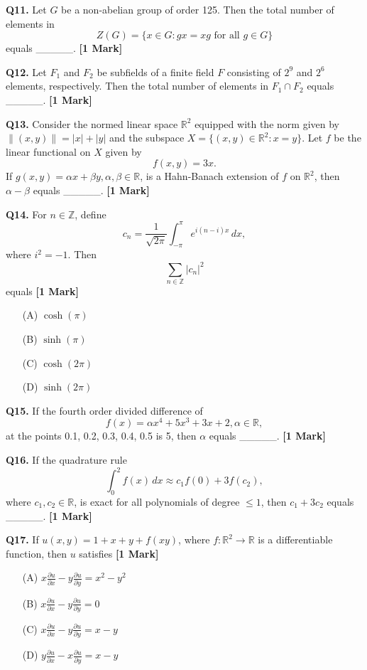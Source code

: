 \documentclass[11pt]{article}
\newcommand{\questiona}[2]{
    \noindent\textbf{Q#2.} #1 \hfill \textbf{[1 Mark]}
}
\begin{document}
\questiona{Let \( G \) be a non-abelian group of order 125. Then the total number of elements in \[Z(G) = \{ x \in G : g x = x g \text{ for all } g \in G \}\] equals \_\_\_\_\_.}{11}
\vspace{0.5cm}

\questiona{Let \( F_1 \) and \( F_2 \) be subfields of a finite field \( F \) consisting of \( 2^9 \) and \( 2^6 \) elements, respectively. Then the total number of elements in \( F_1 \cap F_2 \) equals \_\_\_\_\_.}{12}
\vspace{0.5cm}

\questiona{Consider the normed linear space \(\mathbb{R}^2\) equipped with the norm given by \(\|(x, y)\| = |x| + |y|\) and the subspace \(X = \{(x, y) \in \mathbb{R}^2 : x = y\}\). Let \(f\) be the linear functional on \(X\) given by \[ f(x, y) = 3x. \] If \(g(x, y) = \alpha x + \beta y, \alpha, \beta \in \mathbb{R}\), is a Hahn-Banach extension of \(f\) on \(\mathbb{R}^2\), then \(\alpha - \beta\) equals \_\_\_\_\_.}{13}
\vspace{0.5cm}

\questiona{For \(n \in \mathbb{Z}\), define \[ c_n = \frac{1}{\sqrt{2\pi}} \int_{-\pi}^{\pi} e^{i(n-i)x} \, dx, \] where \(i^2 = -1\). Then \[ \sum_{n \in \mathbb{Z}} |c_n|^2 \] equals}{14}
\begin{enumerate}
    \item[(A)] \(\cosh(\pi)\)  
    \item[(B)] \(\sinh(\pi)\)  
    \item[(C)] \(\cosh(2\pi)\)  
    \item[(D)] \(\sinh(2\pi)\)  
\end{enumerate}
\vspace{0.5cm}

\questiona{If the fourth order divided difference of \[ f(x) = \alpha x^4 + 5x^3 + 3x + 2, \alpha \in \mathbb{R}, \] at the points 0.1, 0.2, 0.3, 0.4, 0.5 is 5, then \(\alpha\) equals \_\_\_\_\_.}{15}
\vspace{0.5cm}

\questiona{If the quadrature rule \[ \int_0^2 f(x) \, dx \approx c_1 f(0) + 3 f(c_2), \] where \(c_1, c_2 \in \mathbb{R}\), is exact for all polynomials of degree \(\leq 1\), then \(c_1 + 3c_2\) equals \_\_\_\_\_.}{16}
\vspace{0.5cm}

\questiona{If \( u(x, y) = 1 + x + y + f(xy) \), where \( f: \mathbb{R}^2 \to \mathbb{R} \) is a differentiable function, then \( u \) satisfies}{17}
\begin{enumerate}
    \item[(A)] \( x \frac{\partial u}{\partial x} - y \frac{\partial u}{\partial y} = x^2 - y^2 \)  
    \item[(B)] \( x \frac{\partial u}{\partial x} - y \frac{\partial u}{\partial y} = 0 \)  
    \item[(C)] \( x \frac{\partial u}{\partial x} - y \frac{\partial u}{\partial y} = x - y \)  
    \item[(D)] \( y \frac{\partial u}{\partial x} - x \frac{\partial u}{\partial y} = x - y \)  
\end{enumerate}
\vspace{0.5cm}
\end{document}
